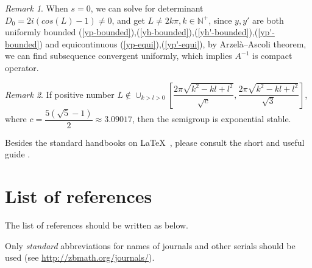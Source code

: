 \documentclass[a4paper,draft]{amsproc}
\theoremstyle{plain}
\theoremstyle{definition}
\theoremstyle{remark}
\newtheorem{rem}{Remark}[section]
\numberwithin{equation}{section}
\begin{document}
\begin{rem}
 When $s=0$, we can solve for determinant $D_0=2i(cos(L)-1)\neq 0$, and get $L\neq 2k\pi ,k\in \mathbb{N^+}$, since $y, y'$ are both uniformly bounded (\ref{yp-bounded}),(\ref{yh-bounded}),(\ref{yh'-bounded}),(\ref{yp'-bounded}) and  equicontinuous (\ref{yp-equi}),(\ref{yp'-equi}), by Arzelà–Ascoli theorem, we can find subsequence convergent uniformly, which implies $A^{-1}$ is compact operator.
\end{rem}
\begin{rem}
If positive number $L \not\in \cup_{k>l>0}[\dfrac{2\pi\sqrt{k^2-kl+l^2}}{\sqrt{c}},\dfrac{2\pi\sqrt{k^2-kl+l^2}}{\sqrt{3}}]$, where $c=\dfrac{5(\sqrt{5}-1)}{2}\approx 3.09017$, then the semigroup is exponential stable.
\end{rem}
\begin{figure}[htb]
\caption{}
\label{some label}
\end{figure}

Besides the standard handbooks on \LaTeX\ \cite{Gr,Lmp,Lbible},
please consult the short and useful guide \cite{TrzG}.


\section{List of references}

The list of references should be written as below.

Only \emph{standard} abbreviations for names of journals and other serials
should be used (see \url{http://zbmath.org/journals/}).
\end{document}
